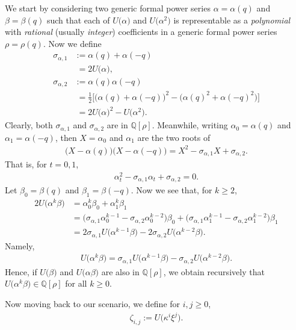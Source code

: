 \documentclass[12pt,reqno]{amsart}
\numberwithin{equation}{section}
\theoremstyle{theorem}
\theoremstyle{definition}
\begin{document}
We start by considering two generic formal power series $\alpha=\alpha(q)$ and $\beta=\beta(q)$ such that each of $U\big(\alpha\big)$ and $U\big(\alpha^2\big)$ is representable as a \emph{polynomial} with \emph{rational} (usually \emph{integer}) coefficients in a generic formal power series $\rho=\rho(q)$. Now we define
\begin{align*}
	\sigma_{\alpha,1} &:= \alpha(q)+\alpha(-q)\\
	&\;= 2U\big(\alpha\big),\\[6pt]
	\sigma_{\alpha,2} &:= \alpha(q)\alpha(-q)\\
	&\;= \tfrac{1}{2}\big[\big(\alpha(q)+\alpha(-q)\big)^2-\big(\alpha(q)^2+\alpha(-q)^2\big)\big]\\
	&\; = 2U\big(\alpha\big)^2-U\big(\alpha^2\big).
\end{align*}
Clearly, both $\sigma_{\alpha,1}$ and $\sigma_{\alpha,2}$ are in $\mathbb{Q}[\rho]$. Meanwhile, writing $\alpha_0=\alpha(q)$ and $\alpha_1=\alpha(-q)$, then $X=\alpha_0$ and $\alpha_1$ are the two roots of
\begin{align*}
	\big(X-\alpha(q)\big)\big(X-\alpha(-q)\big) = X^2 - \sigma_{\alpha,1} X+ \sigma_{\alpha,2}.
\end{align*}
That is, for $t=0,1$,
\begin{align*}
	\alpha_t^2 - \sigma_{\alpha,1} \alpha_t + \sigma_{\alpha,2} = 0.
\end{align*}
Let $\beta_0=\beta(q)$ and $\beta_1=\beta(-q)$. Now we see that, for $k\ge 2$,
\begin{align*}
	2U\big(\alpha^k \beta\big) &= \alpha_0^k\beta_0 + \alpha_1^k\beta_1\\
	&= \big(\sigma_{\alpha,1}\alpha_0^{k-1}-\sigma_{\alpha,2}\alpha_0^{k-2}\big)\beta_0 + \big(\sigma_{\alpha,1}\alpha_1^{k-1}-\sigma_{\alpha,2}\alpha_1^{k-2}\big)\beta_1\\
	&= 2\sigma_{\alpha,1} U\big(\alpha^{k-1}\beta\big) - 2\sigma_{\alpha,2} U\big(\alpha^{k-2}\beta\big).
\end{align*}
Namely,
\begin{align*}
	U\big(\alpha^k \beta\big) = \sigma_{\alpha,1} U\big(\alpha^{k-1}\beta\big) - \sigma_{\alpha,2} U\big(\alpha^{k-2}\beta\big).
\end{align*}
Hence, if $U\big(\beta\big)$ and $U\big(\alpha\beta\big)$ are also in $\mathbb{Q}[\rho]$, we obtain recursively that $U\big(\alpha^k\beta\big)\in \mathbb{Q}[\rho]$ for all $k\ge 0$.

Now moving back to our scenario, we define for $i,j\ge 0$,
\begin{align}\label{eq:def-zeta}
	\zeta_{i,j} := U\big(\kappa^i\xi^j\big).
\end{align}
\end{document}

